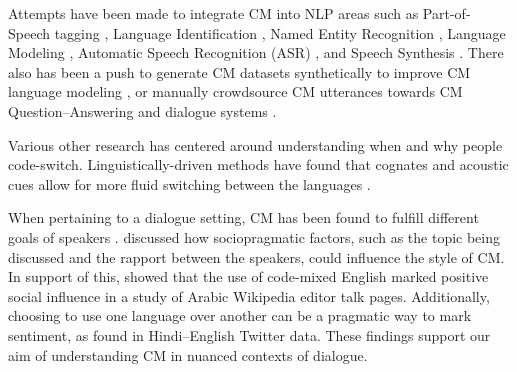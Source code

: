 \documentclass[11pt,a4paper]{article}
\begin{document}
Attempts have been made to integrate CM into NLP areas such as Part-of-Speech tagging \citep{Solorio2008,soto2018joint}, Language Identification \citep{soto2018joint,Rijhwani2017}, Named Entity Recognition \citep{aguilar2018named}, Language Modeling \citep{chandu2018language}, Automatic Speech Recognition (ASR) \citep{yilmaz2018building}, and Speech Synthesis \citep{Rallabandi2017}.
There also has been a push to generate CM datasets synthetically to improve CM language modeling \citep{pratapa2018language}, or manually crowdsource CM utterances towards CM Question--Answering and dialogue systems \citep{chandu2018code,banerjee2018dataset}.


Various other research has centered around understanding when and why people code-switch.
Linguistically-driven methods have found that cognates and acoustic cues allow for more fluid switching between the languages \citep{kootstra2012priming,Fricke2016}.

When pertaining to a dialogue setting, CM has been found to fulfill different goals of speakers \citep{begum2016functions}. \citet{Solorio2008} discussed how sociopragmatic factors, such as the topic being discussed and the rapport between the speakers, could influence the style of CM.
In support of this, \citet{Yoder2017} showed that the use of code-mixed English marked positive social influence in a study of Arabic Wikipedia editor talk pages.
Additionally, choosing to use one language over another can be a pragmatic way to mark sentiment, as \citet{rudra2016understanding} found in Hindi--English Twitter data.
These findings support our aim of understanding CM in nuanced contexts of dialogue.
\end{document}
